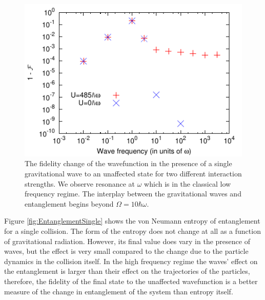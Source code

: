 \begin{figure}[htbp]
  \begin{center}
    \includegraphics[width=120mm]{Images/Freqs.pdf}
    \caption{\label{fig:Freqs} The fidelity change of the wavefunction
      in the presence of a single gravitational wave to an unaffected
      state for two different interaction strengths. We observe
      resonance at $\omega$ which is in the classical low frequency
      regime. The interplay between the gravitational waves and
      entanglement begins beyond $\Omega = 10 \hbar \omega$.}
  \end{center}
\end{figure}

Figure \ref{fig:EntanglementSingle} shows the von Neumann entropy of
entanglement for a single collision. The form of the entropy does not
change at all as a function of gravitational radiation. However, its
final value does vary in the presence of waves, but the effect is very
small compared to the change due to the particle dynamics in the
collision itself. In the high frequency regime the waves' effect on
the entanglement is larger than their effect on the trajectories of
the particles, therefore, the fidelity of the final state to the
unaffected wavefunction is a better measure of the change in
entanglement of the system than entropy itself.

